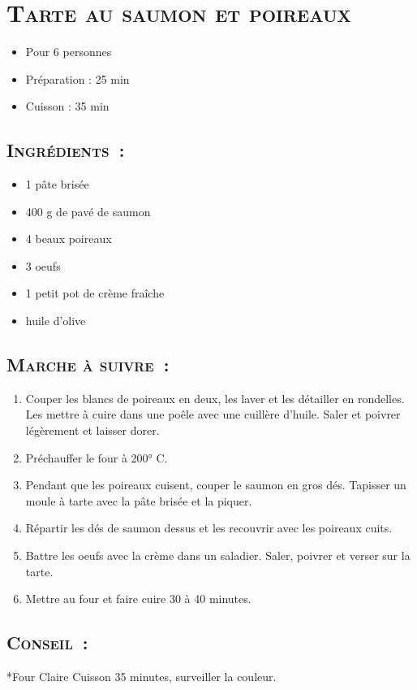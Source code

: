 \section[\normalsize{Tarte au saumon et poireaux}]{\LARGE{\textsc{Tarte au saumon et poireaux}}}		%


\begin{itemize}
\item Pour 6 personnes
\item Préparation : 25 min
\item Cuisson : 35 min
\end{itemize}

\subsection*{\textsc{Ingr\'edients~:}}

\begin{itemize}
\item 1 p\^ate bris\'ee
\item 400 g de pav\'e de saumon
\item 4 beaux poireaux
\item 3 oeufs
\item 1 petit pot de cr\`eme fra\^iche
\item huile d'olive
\end{itemize}


\subsection*{\textsc{Marche \`a suivre~:}}

\begin{enumerate}
\item Couper les blancs de poireaux en deux, les laver et les d\'etailler en rondelles. Les mettre \`a cuire dans une po\^ele avec une cuill\`ere d'huile. Saler et poivrer l\'eg\`erement et laisser dorer.

\item Pr\'echauffer le four \`a 200° C.

\item Pendant que les poireaux cuisent, couper le saumon en gros d\'es. Tapisser un moule \`a tarte avec la p\^ate bris\'ee et la piquer. 

\item R\'epartir les d\'es de saumon dessus et les recouvrir avec les poireaux cuits.

\item Battre les oeufs avec la cr\`eme dans un saladier. Saler, poivrer et verser sur la tarte.

\item Mettre au four et faire cuire 30 \`a 40 minutes.
\end{enumerate}
\subsection*{\textsc{Conseil~:}}

*Four Claire Cuisson 35 minutes, surveiller la couleur.
